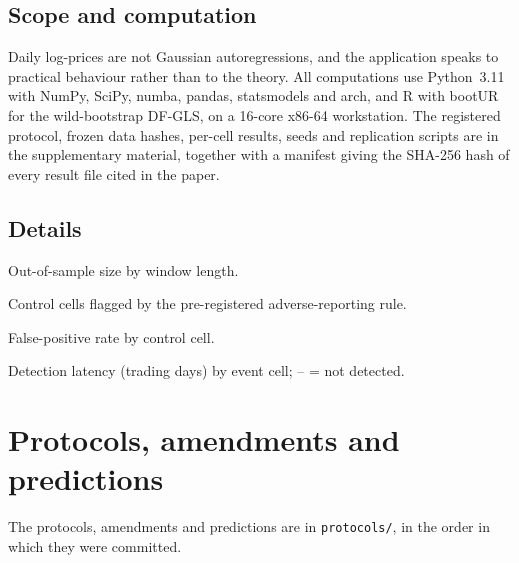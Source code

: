 \documentclass[11pt]{article}
\begin{document}
\subsection*{Scope and computation}

Daily log-prices are not Gaussian autoregressions, and the application
speaks to practical behaviour rather than to the theory. All computations
use Python~3.11 with NumPy, SciPy, numba, pandas, statsmodels and arch,
and R with bootUR for the wild-bootstrap DF-GLS, on a 16-core x86-64
workstation. The registered protocol, frozen data hashes, per-cell
results, seeds and replication scripts are in the supplementary material,
together with a manifest giving the SHA-256 hash of every result file
cited in the paper.

\subsection*{Details}

\begin{table}[htbp]
\centering
\caption{Out-of-sample size by window length.}
\label{tab:oos}
\small
\begin{adjustbox}{max width=\textwidth}

\end{adjustbox}
\end{table}

\begin{table}[htbp]
\centering
\caption{Control cells flagged by the pre-registered adverse-reporting rule.}
\label{tab:adverse}
\small
\begin{adjustbox}{max width=\textwidth}

\end{adjustbox}
\end{table}

\begin{table}[htbp]
\centering
\caption{False-positive rate by control cell.}
\label{tab:fpcell}
\small
\begin{adjustbox}{max width=\textwidth}

\end{adjustbox}
\end{table}

\begin{table}[htbp]
\centering
\caption{Detection latency (trading days) by event cell; -- = not detected.}
\label{tab:latency}
\small
\begin{adjustbox}{max width=\textwidth}

\end{adjustbox}
\end{table}

\FloatBarrier
\section{Protocols, amendments and predictions}\label{supp:s10}

The protocols, amendments and predictions are in \texttt{protocols/}, in the order in which they were committed.

\FloatBarrier


\end{document}
